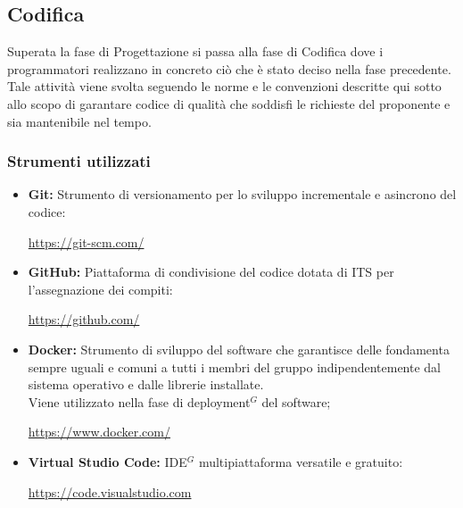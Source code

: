 \subsection{Codifica}
Superata la fase di Progettazione si passa alla fase di Codifica dove i programmatori
realizzano in concreto ciò che è stato deciso nella fase precedente.
Tale attività viene svolta seguendo le norme e le convenzioni descritte qui sotto allo
scopo di garantare codice di qualità che soddisfi le richieste del proponente e sia mantenibile nel tempo.

\subsubsection{Strumenti utilizzati}
    \begin{itemize}
    \item \textbf{Git:} Strumento di versionamento per lo sviluppo incrementale e asincrono del codice:
    \begin{center}
      \url{https://git-scm.com/}
    \end{center}
    \item \textbf{GitHub:} Piattaforma di condivisione del codice dotata di ITS per l'assegnazione dei compiti:
    \begin{center}
      \url{https://github.com/}
    \end{center}
    \item \textbf{Docker:} Strumento di sviluppo del software che garantisce delle fondamenta sempre uguali
      e comuni a tutti i membri del gruppo indipendentemente dal sistema operativo e dalle librerie installate. \\
      Viene utilizzato nella fase di deployment$^{G}$ del software;
      \begin{center}
        \url{https://www.docker.com/}
      \end{center}
    \item \textbf{Virtual Studio Code:} IDE$^{G}$ multipiattaforma versatile e gratuito:
    \begin{center}
      \url{https://code.visualstudio.com}
    \end{center}
    \end{itemize}
